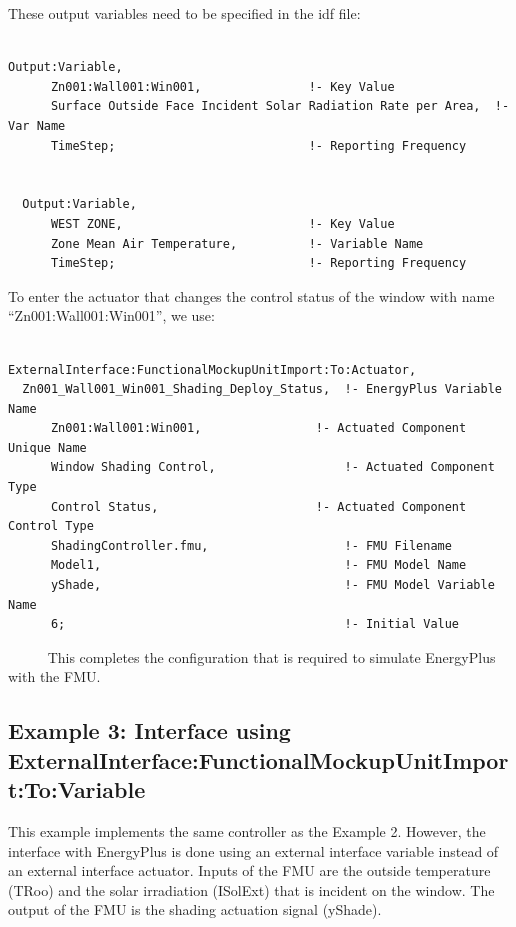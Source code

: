 These output variables need to be specified in the idf file:

\begin{lstlisting}

Output:Variable,
      Zn001:Wall001:Win001,               !- Key Value
      Surface Outside Face Incident Solar Radiation Rate per Area,  !- Var Name
      TimeStep;                           !- Reporting Frequency


  Output:Variable,
      WEST ZONE,                          !- Key Value
      Zone Mean Air Temperature,          !- Variable Name
      TimeStep;                           !- Reporting Frequency
\end{lstlisting}

To enter the actuator that changes the control status of the window with name ``Zn001:Wall001:Win001'', we use:

\begin{lstlisting}

ExternalInterface:FunctionalMockupUnitImport:To:Actuator,
  Zn001_Wall001_Win001_Shading_Deploy_Status,  !- EnergyPlus Variable Name
      Zn001:Wall001:Win001,                !- Actuated Component Unique Name
      Window Shading Control,                  !- Actuated Component Type
      Control Status,                      !- Actuated Component Control Type
      ShadingController.fmu,                   !- FMU Filename
      Model1,                                  !- FMU Model Name
      yShade,                                  !- FMU Model Variable Name
      6;                                       !- Initial Value
\end{lstlisting}

~~~~~ This completes the configuration that is required to simulate EnergyPlus with the FMU.

\subsection{Example 3: Interface using ExternalInterface:FunctionalMockupUnitImport:To:Variable}\label{example-3-interface-using-externalinterfacefunctionalmockupunitimporttovariable}

This example implements the same controller as the Example 2. However, the interface with EnergyPlus is done using an external interface variable instead of an external interface actuator. Inputs of the FMU are the outside temperature (TRoo) and the solar irradiation (ISolExt) that is incident on the window. The output of the FMU is the shading actuation signal (yShade).


